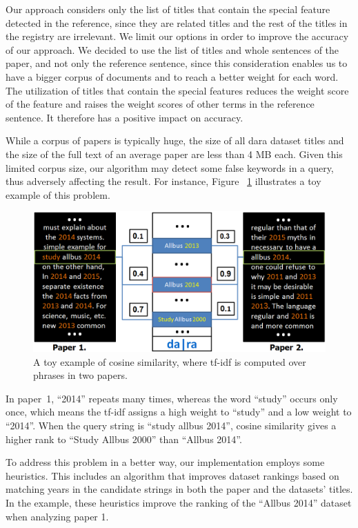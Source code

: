\documentclass{IOS-Book-Article}
\newcommand{\dara}{\textsf{da\textbar ra}}
\begin{document}
Our approach considers only the list of titles that contain the special feature detected in the reference, since they are related titles and the rest of the titles in the registry are irrelevant. We limit our options in order to improve the accuracy of our approach. We decided to use the list of titles and whole sentences of the paper, and not only the reference sentence, since this consideration enables us to have a bigger corpus of documents and to reach a better weight for each word. The utilization of titles that contain the special features reduces the weight score of the feature and raises the weight scores of other terms in the reference sentence. It therefore has a positive impact on accuracy.

While a corpus of papers is typically huge, the size of all {\dara} dataset titles and the size of the full text of an average paper are less than 4 MB each. Given this limited corpus size, our algorithm may detect some false keywords in a query, thus adversely affecting the result. For instance, Figure ~\ref{fig:similarity-example} illustrates a toy example of this problem.

\begin{figure}[h]
	\centering
	\includegraphics[width=4.5 in]{ToyExamplE.PNG} 
	\caption{A toy example of cosine similarity, where tf-idf is computed over phrases in two papers.}
	\label{fig:similarity-example}
\end{figure}

In paper~1, \enquote{2014} repeats many times, whereas the word \enquote{study} occurs only once, which means the tf-idf assigns a high weight to \enquote{study} and a low weight to \enquote{2014}. When the query string is \enquote{study allbus 2014}, cosine similarity gives a higher rank to \enquote{Study Allbus 2000} than \enquote{Allbus 2014}.

To address this problem in a better way, our implementation employs some heuristics. This includes an algorithm that improves dataset rankings based on matching years in the candidate strings in both the paper and the datasets' titles. In the example, these heuristics improve the ranking of the \enquote{Allbus 2014} dataset when analyzing paper 1. 
\end{document}
